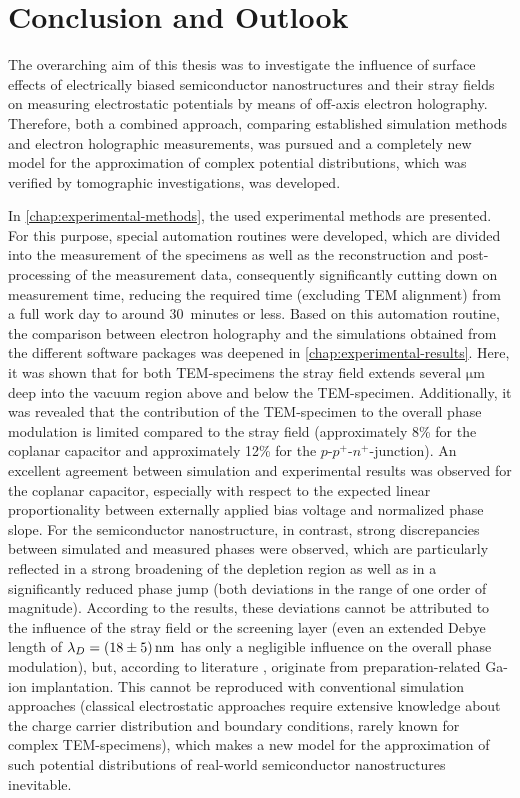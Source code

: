 \chapter{Conclusion and Outlook} \label{chap:Conclusion}
The overarching aim of this thesis was to investigate the influence of surface effects of electrically biased semiconductor nanostructures and their stray fields on measuring electrostatic potentials by means of off-axis electron holography. Therefore, both a combined approach, comparing established simulation methods and electron holographic measurements, was pursued and a completely new model for the approximation of complex potential distributions, which was verified by tomographic investigations, was developed.

In \cref{chap:experimental-methods}, the used experimental methods are presented. For this purpose, special automation routines were developed, which are divided into the measurement of the specimens as well as the reconstruction and post-processing of the measurement data, consequently significantly cutting down on measurement time, reducing the required time (excluding TEM alignment) from a full work day to around 30~minutes or less. Based on this automation routine, the comparison between electron holography and the simulations obtained from the different software packages was deepened in \cref{chap:experimental-results}. Here, it was shown that for both TEM-specimens the stray field extends several $\si{\um}$ deep into the vacuum region above and below the TEM-specimen. Additionally, it was revealed that the contribution of the TEM-specimen to the overall phase modulation is limited compared to the stray field (approximately 8\% for the coplanar capacitor and approximately 12\% for the $p$-$p^+$-$n^+$-junction). An excellent agreement between simulation and experimental results was observed for the coplanar capacitor, especially with respect to the expected linear proportionality between externally applied bias voltage and normalized phase slope. For the semiconductor nanostructure, in contrast, strong discrepancies between simulated and measured phases were observed, which are particularly reflected in a strong broadening of the depletion region as well as in a significantly reduced phase jump (both deviations in the range of one order of magnitude). According to the results, these deviations cannot be attributed to the influence of the stray field or the screening layer (even an extended Debye length of $\lambda_D = \SI{18 \pm 5}{\nm}$ has only a negligible influence on the overall phase modulation), but, according to literature \cite{Twitchett-Harrison2007}, originate from preparation-related Ga-ion implantation. This cannot be reproduced with conventional simulation approaches (classical electrostatic approaches require extensive knowledge about the charge carrier distribution and boundary conditions, rarely known for complex TEM-specimens), which makes a new model for the approximation of such potential distributions of real-world semiconductor nanostructures inevitable.

